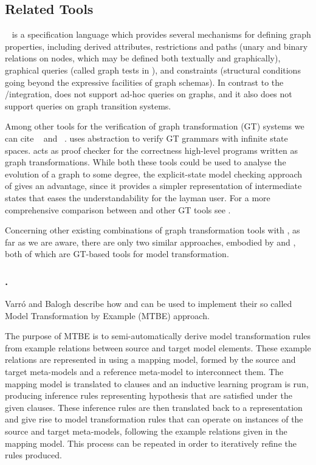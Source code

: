 %
\subsection{Related Tools}

\PROGRES~\cite{progress} is a specification language which provides several
mechanisms for defining graph properties, including derived attributes,
restrictions and paths (unary and binary relations on nodes, which may be
defined both textually and graphically), graphical queries (called graph tests
in \PROGRES), and constraints (structural conditions going beyond the expressive
facilities of graph schemas). In contrast to the \GROOVE/\Prolog integration,
\PROGRES does not support ad-hoc queries on graphs, and it also does not support
queries on graph transition systems.

Among other tools for the verification of graph transformation (GT) systems
we can cite \AUGUR~\cite{KonKoz2008} and \ENFORCE~\cite{AHPZ06}. \AUGUR uses
abstraction to verify GT grammars with infinite state spaces. \ENFORCE acts as
proof checker for the correctness high-level programs written as graph
transformations. While both these tools could be used to analyse the evolution
of a graph to some degree, the explicit-state model checking approach of \GROOVE
gives an advantage, since it provides a simpler representation of intermediate
states that eases the understandability for the layman user. For a more
comprehensive comparison between \GROOVE and other GT tools see \cite{STTT}.

Concerning other existing combinations of graph transformation tools with
\Prolog, as far as we are aware, there are only two similar approaches, embodied
by \VIATRA \cite{VIATRA} and \VMTS \cite{VMTS}, both of which are GT-based tools
for model transformation.

\subsubsection{\VIATRA.}

Varr\'o and Balogh \cite{VIATRA-MTBE} describe how \VIATRA and \Prolog can be
used to implement their so called Model Transformation by Example (MTBE)
approach.

The purpose of MTBE is to semi-automatically derive model transformation rules
from example relations between source and target model elements. These example
relations are represented in \VIATRA using a mapping model, formed by the
source and target meta-models and a reference meta-model to interconnect them.
The mapping model is translated to \Prolog clauses and an inductive learning
program is run, producing \Prolog inference rules representing hypothesis that
are satisfied under the given clauses. These inference rules are then
translated back to a \VIATRA representation and give rise to model
transformation rules that can operate on instances of the source and target
meta-models, following the example relations given in the mapping model. This
process can be repeated in order to iteratively refine the rules produced.

